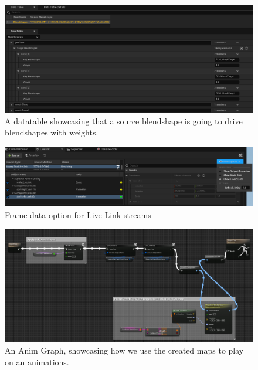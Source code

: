 \documentclass{uva-inf-article}
\begin{document}
\begin{figure}[hbt!]
    \centering
    \includegraphics[width=\textwidth]{imgs/blendshapeRemapSnippet.png}
    \caption{A datatable showcasing that a source blendshape is going to drive blendshapes with weights.}
    \label{fig:datatablesnippet}
\end{figure}


\begin{figure}[hbt!]
    \centering
    \includegraphics[width=\textwidth]{imgs/livelinkoptions.png}
    \caption{Frame data option for Live Link streams}
    \label{fig:livelinkoptions}
\end{figure}

\begin{figure}[hbt!]
    \centering
    \includegraphics[width=1\textwidth]{imgs/ssAndLLFAnimGraph.png}
    \caption{An Anim Graph, showcasing how we use the created maps to play on an animations.}
    \label{fig:animgraphssLLF}
\end{figure}
\end{document}
